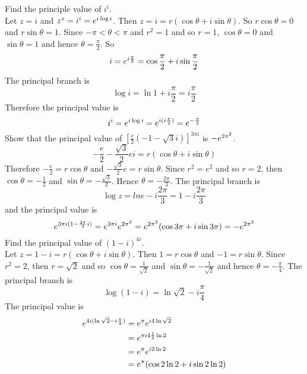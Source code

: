 \documentclass[12pt]{article}
\begin{document}
Find the principle value of $i^i$. \\
Let $z = i$ and $z^z = i^i = e^{i \log i}$. Then $z = i = r(\cos \theta + i\sin \theta)$. So $r\cos \theta = 0$ and $r\sin\theta = 1$. Since $-\pi < \theta < \pi$ and $r^2 = 1$ and so $r = 1$, $\cos \theta = 0 $ and $\sin \theta = 1$ and hence $\theta = \frac{\pi}{2}$. So $$ i = e^{i\frac{\pi}{2}} = \cos \frac{\pi}{2} + i\sin \frac{\pi}{2} $$ 
The principal branch is $$ \log i = \ln 1 + i\frac{\pi}{2} = i\frac{\pi}{2}$$ 
Therefore the principal value is $$ i^i = e^{i \log i} = e^{i(i\frac{\pi}{2})} = e^{-\frac{\pi}{2}}$$ 
Show that the principal value of $\left[ \frac{e}{2} (-1 - \sqrt{3}i)\right]^{3\pi i}$ is $-e^{2\pi^2}$.
$$ -\frac{e}{2} - \frac{\sqrt{3}}{2}ei = r(\cos \theta + i\sin \theta)$$ 
Therefore $-\frac{e}{2} = r\cos \theta$ and $-\frac{\sqrt{3}}{2} e= r\sin \theta$. Since $r^2 = e^2$ and so $r = 2$, then $\cos \theta = -\frac{1}{2}$ and $\sin \theta = -\frac{\sqrt{3}}{2}$. Hence $\theta = -\frac{2\pi}{3}$. The principal branch is 
$$ \log z = ln e - i \frac{2\pi}{3} = 1 - i\frac{2\pi}{3} $$ 
and the principal value is $$ e^{3\pi i(1 - \frac{2\pi}{3}i)} = e^{3\pi i} e^{2\pi^2} = e^{2\pi^2}(\cos 3\pi + i\sin 3\pi) = -e^{2\pi^2} $$ 
Find the principal value of $(1-i)^{4i}$. \\
Let $z = 1 - i = r(\cos \theta + i\sin \theta)$. Then $1 = r\cos \theta$ and $-1 = r\sin \theta$. Since $r^2 = 2$, then $r = \sqrt{2}$ and so $\cos \theta = \frac{1}{\sqrt{2}}$ and $\sin \theta = -\frac{1}{\sqrt{2}}$ and hence $\theta = -\frac{\pi}{4}$. The principal branch is 
$$\log (1-i) = \ln \sqrt{2} - i\frac{\pi}{4}$$ 
The principal value is $$ \begin{aligned} e^{4i(\ln \sqrt{2} - i\frac{\pi}{4})} &= e^{\pi} e^{i4\ln \sqrt{2}} \\ &= e^{\pi i4 \frac{1}{2}\ln 2} \\ &= e^{\pi}e^{i2\ln 2} \\ &= e^{\pi}(\cos 2\ln 2 + i\sin 2\ln 2) \end{aligned} $$ 
\end{document}
